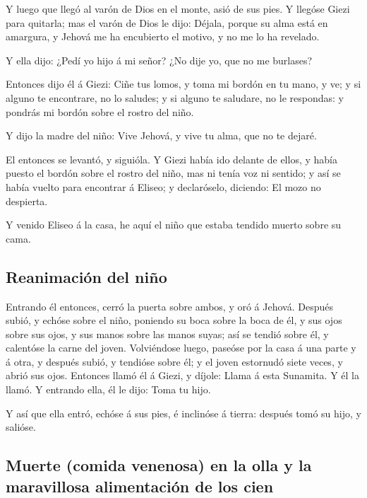  Y luego que llegó al varón de Dios en el monte, asió de
sus pies. Y llegóse Giezi para quitarla; mas el varón de Dios le dijo:
Déjala, porque su alma está en amargura, y Jehová me ha encubierto el
motivo, y no me lo ha revelado.

 Y ella dijo: ¿Pedí yo hijo á mi señor? ¿No dije yo, que no
me burlases?

 Entonces dijo él á Giezi: Ciñe tus lomos, y toma mi bordón
en tu mano, y ve; y si alguno te encontrare, no lo saludes; y si alguno
te saludare, no le respondas: y pondrás mi bordón sobre el rostro del
niño.

 Y dijo la madre del niño: Vive Jehová, y vive tu alma, que
no te dejaré.

 El entonces se levantó, y siguióla. Y Giezi había ido
delante de ellos, y había puesto el bordón sobre el rostro del niño, mas
ni tenía voz ni sentido; y así se había vuelto para encontrar á Eliseo;
y declaróselo, diciendo: El mozo no despierta.

 Y venido Eliseo á la casa, he aquí el niño que estaba
tendido muerto sobre su cama.

\hypertarget{reanimaciuxf3n-del-niuxf1o}{%
\subsection{Reanimación del niño}\label{reanimaciuxf3n-del-niuxf1o}}

 Entrando él entonces, cerró la puerta sobre ambos, y oró á
Jehová.  Después subió, y echóse sobre el niño, poniendo su
boca sobre la boca de él, y sus ojos sobre sus ojos, y sus manos sobre
las manos suyas; así se tendió sobre él, y calentóse la carne del joven.
 Volviéndose luego, paseóse por la casa á una parte y á
otra, y después subió, y tendióse sobre él; y el joven estornudó siete
veces, y abrió sus ojos.  Entonces llamó él á Giezi, y
díjole: Llama á esta Sunamita. Y él la llamó. Y entrando ella, él le
dijo: Toma tu hijo.

 Y así que ella entró, echóse á sus pies, é inclinóse á
tierra: después tomó su hijo, y salióse.

\hypertarget{muerte-comida-venenosa-en-la-olla-y-la-maravillosa-alimentaciuxf3n-de-los-cien}{%
\subsection{Muerte (comida venenosa) en la olla y la maravillosa
alimentación de los
cien}\label{muerte-comida-venenosa-en-la-olla-y-la-maravillosa-alimentaciuxf3n-de-los-cien}}


